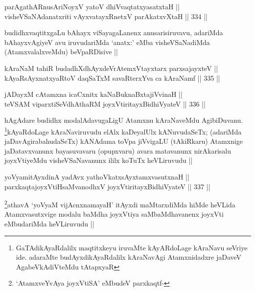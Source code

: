 \begin{shl}
parAgathARnusAriNoyxV yatoV dhiVvaqtatxyasatxtaH || \\
visheVSaNAdanatxriti vAyxvatayxRnetxV parAkatxvXtaH ||  334 ||  
\end{shl}

\begin{artha}
budidhxvaqtitxgaLu bAhayx viSayagaLanenx anusarisiruvavu, adariMda bAhayxvAgiyeV avu iruvudariMda `anatx:' eMba visheVSaNadiMda (AtamxvalalxveMdu) beVpaRDisive ||
\end{artha}


\begin{shl}
kAraNaM tahiR budadhXdhAyxdeVrAtemxVtayxtarx parxsajayxteV || \\
kAyaRsAyxnatxyaRtoV daqSaTxM savaRterxYva ca kAraNamf ||  335 ||  
\end{shl}
				
\begin{shl}
jADayxM cA\s \s tamxna icaCxnitx kaNaBuknaBxtajiVvinaH || \\
teVSAM viparxtiSeVdhAthaRM joyxVtiritayxBidhiVyateV ||  336 ||  
\end{shl}

\begin{artha}
hAgAdare budidhx modalAdavugaLigU Atamxnu kAraNaveMdu AgibiDuvanu. \footnote{GaTAdikAyaRdalilx maqtitxkeyu iruvaMte kAyARdoLage kAraNavu seVriye ide. adaraMte budAyxdikAyaRdalilx kAraNavAgi Atamxnidadxre jaDaveV AgabeVkAdiVteMdu tAtapxyaR}kAyaRdoLage kAraNaviruvudu elAlx kaDeyalUlx kANuvudaSeTx; (adariMda jaDavAgirabahudaSeTx) kANAdama toVpa jiVvigaLU (tAkiRkaru) Atamxnige jaDatavxvanunx bayasuvavaru (opupxvaru) avara matavanunx nirAkarisalu joyxVtiyeMdu visheVSaNavanunx ililx koTuTx heVLiruvudu ||
\end{artha}

\begin{shl}
yoV\s yamitAyxdinA yadAvx yathoVkatxsAyx\s \s tamxvasutxnaH || \\
parxkaqtajoyxVtiHsaMvanodhxV joyxVtiritayxBidhiVyateV ||  337 ||  
\end{shl}

\begin{artha}
\footnote{`AtamxveYvAya joyxVtiSA' eMbudeV parxkaqtf-}athavA `yoV\s yaM vijAcnxnamayaH' itAyxdi maMtarxdiMda hiMde heVLida Atamxvasutxvige modalu baMdha joyxVtiya saMbaMdhavanenx joyxVti eMbudariMda heVLiruvudu ||
\end{artha}

